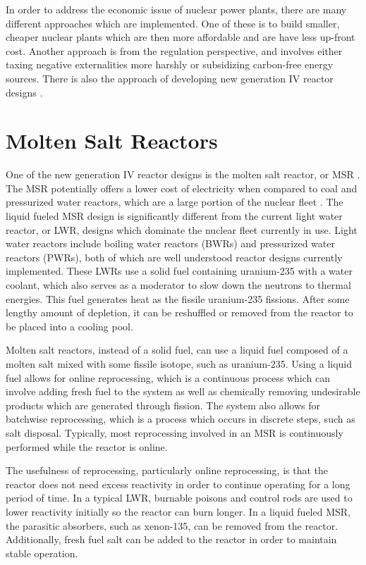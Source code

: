 In order to address the economic issue of nuclear power plants, there are many different approaches which are implemented. One of these is to build smaller, cheaper nuclear plants which are then more affordable and are have less up-front cost. Another approach is from the regulation perspective, and involves either taxing negative externalities more harshly or subsidizing carbon-free energy sources. There is also the approach of developing new generation IV reactor designs \cite{kelly_generation_2014}.

\section{Molten Salt Reactors}

One of the new generation IV reactor designs is the molten salt reactor, or MSR \cite{kelly_generation_2014}. The MSR potentially offers a lower cost of electricity when compared to coal and pressurized water reactors, which are a large portion of the nuclear fleet \cite{moir_cost_2002}. The liquid fueled MSR design is significantly different from the current light water reactor, or LWR, designs which dominate the nuclear fleet currently in use. Light water reactors include boiling water reactors (BWRs) and pressurized water reactors (PWRs), both of which are well understood reactor designs currently implemented. These LWRs use a solid fuel containing uranium-235 with a water coolant, which also serves as a moderator to slow down the neutrons to thermal energies. This fuel generates heat as the fissile uranium-235 fissions. After some lengthy amount of depletion, it can be reshuffled or removed from the reactor to be placed into a cooling pool.

Molten salt reactors, instead of a solid fuel, can use a liquid fuel composed of a molten salt mixed with some fissile isotope, such as uranium-235. Using a liquid fuel allows for online reprocessing, which is a continuous process which can involve adding fresh fuel to the system as well as chemically removing undesirable products which are generated through fission. The system also allows for batchwise reprocessing, which is a process which occurs in discrete steps, such as salt disposal. Typically, most reprocessing involved in an MSR is continuously performed while the reactor is online.

The usefulness of reprocessing, particularly online reprocessing, is that the reactor does not need excess reactivity in order to continue operating for a long period of time. In a typical LWR, burnable poisons and control rods are used to lower reactivity initially so the reactor can burn longer. In a liquid fueled MSR, the parasitic absorbers, such as xenon-135, can be removed from the reactor. Additionally, fresh fuel salt can be added to the reactor in order to maintain stable operation.


